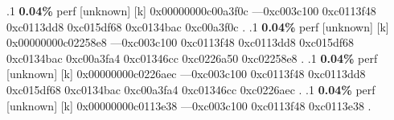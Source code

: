 \begin{profile}
{.1 \textbf{ 0.04\%} perf             [unknown]              [k] 0x00000000c00a3f0c\newline {} ---0xc003c100\newline {} 0xc0113f48\newline {} 0xc0113dd8\newline {} 0xc015df68\newline {} 0xc0134bac\newline {} 0xc00a3f0c\newline {} . 
.1 \textbf{ 0.04\%} perf             [unknown]              [k] 0x00000000c02258e8\newline {} ---0xc003c100\newline {} 0xc0113f48\newline {} 0xc0113dd8\newline {} 0xc015df68\newline {} 0xc0134bac\newline {} 0xc00a3fa4\newline {} 0xc01346cc\newline {} 0xc0226a50\newline {} 0xc02258e8\newline {} . 
.1 \textbf{ 0.04\%} perf             [unknown]              [k] 0x00000000c0226aec\newline {} ---0xc003c100\newline {} 0xc0113f48\newline {} 0xc0113dd8\newline {} 0xc015df68\newline {} 0xc0134bac\newline {} 0xc00a3fa4\newline {} 0xc01346cc\newline {} 0xc0226aec\newline {} . 
.1 \textbf{ 0.04\%} perf             [unknown]              [k] 0x00000000c0113e38\newline {} ---0xc003c100\newline {} 0xc0113f48\newline {} 0xc0113e38\newline {} . 
}
\end{profile}
